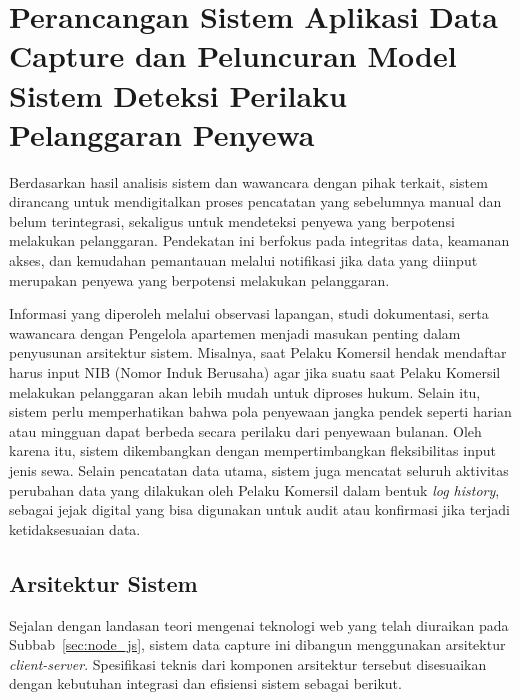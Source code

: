 \section{Perancangan Sistem Aplikasi Data Capture dan Peluncuran Model Sistem Deteksi Perilaku Pelanggaran Penyewa}

Berdasarkan hasil analisis sistem dan wawancara dengan pihak terkait, sistem dirancang untuk mendigitalkan proses pencatatan yang sebelumnya manual dan belum terintegrasi, sekaligus untuk mendeteksi penyewa yang berpotensi melakukan pelanggaran. Pendekatan ini berfokus pada integritas data, keamanan akses, dan kemudahan pemantauan melalui notifikasi jika data yang diinput merupakan penyewa yang berpotensi melakukan pelanggaran.

Informasi yang diperoleh melalui observasi lapangan, studi dokumentasi, serta wawancara dengan Pengelola apartemen menjadi masukan penting dalam penyusunan arsitektur sistem. Misalnya, saat Pelaku Komersil hendak mendaftar harus input NIB (Nomor Induk Berusaha) agar jika suatu saat Pelaku Komersil melakukan pelanggaran akan lebih mudah untuk diproses hukum. Selain itu, sistem perlu memperhatikan bahwa pola penyewaan jangka pendek seperti harian atau mingguan dapat berbeda secara perilaku dari penyewaan bulanan. Oleh karena itu, sistem dikembangkan dengan mempertimbangkan fleksibilitas input jenis sewa. Selain pencatatan data utama, sistem juga mencatat seluruh aktivitas perubahan data yang dilakukan oleh Pelaku Komersil dalam bentuk \textit{log history}, sebagai jejak digital yang bisa digunakan untuk audit atau konfirmasi jika terjadi ketidaksesuaian data.

\subsection{Arsitektur Sistem}
Sejalan dengan landasan teori mengenai teknologi web yang telah diuraikan pada Subbab~\ref{sec:node_js}, sistem {data capture} ini dibangun menggunakan arsitektur \textit{client-server}. Spesifikasi teknis dari komponen arsitektur tersebut disesuaikan dengan kebutuhan integrasi dan efisiensi sistem sebagai berikut.

